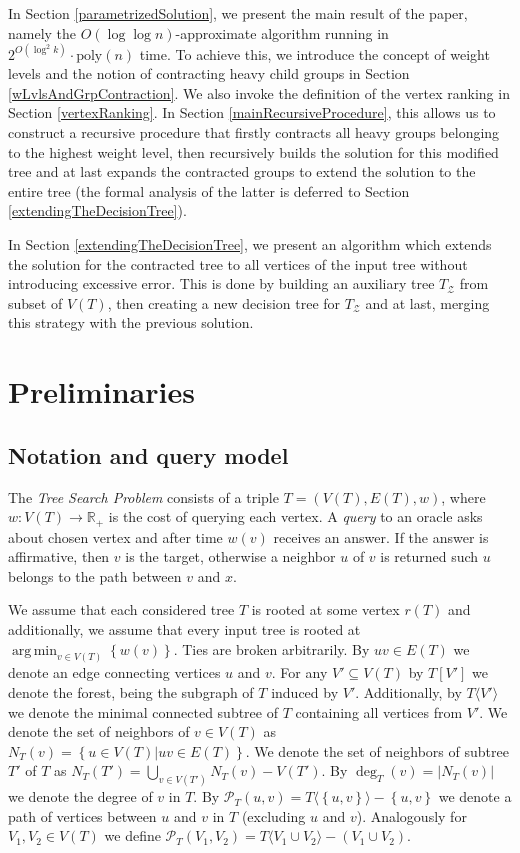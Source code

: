 \documentclass[a4paper, anonymous, numberwithinsect, pdfa, UKenglish,cleveref, autoref, thm-restate]{socg-lipics-v2021}
\newcommand{\br}[1]{\left( #1 \right)}
\newcommand{\brc}[1]{\left\{ #1 \right\}}
\newcommand{\spr}[1]{\left| #1 \right|}
\newcommand{\angl}[1]{\langle #1 \rangle}
\newcommand{\argmin}{\operatorname*{arg\,min}}
\begin{document}
In Section \ref{parametrizedSolution}, we present the main result of the paper, namely the $O\br{\log\log n}$-approximate algorithm running in $2^{O\br{\log^2k}}\cdot\text{poly}\br{n}$ time. To achieve this, we introduce the concept of weight levels and the notion of contracting heavy child groups in Section \ref{wLvlsAndGrpContraction}. We also invoke the definition of the vertex ranking in Section \ref{vertexRanking}. In Section \ref{mainRecursiveProcedure}, this allows us to construct a recursive procedure that firstly contracts all heavy groups belonging to the highest weight level, then recursively builds the solution for this modified tree and at last expands the contracted groups to extend the solution to the entire tree (the formal analysis of the latter is deferred to Section \ref{extendingTheDecisionTree}).

In Section \ref{extendingTheDecisionTree}, we present an algorithm which extends the solution for the contracted tree to all vertices of the input tree without introducing excessive error. This is done by building an auxiliary tree $T_{\mathcal{Z}}$ from subset of $V\br{T}$, then creating a new decision tree for $T_{\mathcal{Z}}$ and at last, merging this strategy with the previous solution.
\section{Preliminaries}\label{preliminaries}
\subsection{Notation and query model}\label{notationAndQueryModel}

The \textit{Tree Search Problem} consists of a triple $T=\br{V\br{T},E\br{T},w}$, where $w:V\br{T}\to \mathbb{R}_{+}$ is the cost of querying each vertex. A \textit{query} to an oracle asks about chosen vertex and after time $w(v)$ receives an answer. If the answer is affirmative, then $v$ is the target, otherwise a neighbor $u$ of $v$ is returned such $u$ belongs to the path between $v$ and $x$. 

We assume that each considered tree $T$ is rooted at some vertex $r\br{T}$ and additionally, we assume that every input tree is rooted at $\argmin_{v\in V\br{T}}\brc{w\br{v}}$. Ties are broken arbitrarily. By $uv\in E\br{T}
$ we denote an edge connecting vertices $u$ and $v$. For any $V'\subseteq V\br{T}$ by $T[V']$ we denote the forest, being the subgraph of $T$ induced by $V'$. Additionally, by $T\angl{V'}$ we denote the minimal connected subtree of $T$ containing all vertices from $V'$. We denote the set of neighbors of $v\in V\br{T}$ as $N_T\br{v} = \brc{u\in V\br{T}|uv\in E\br{T}}$. We denote the set of neighbors of subtree $T'$ of $T$ as $N_T\br{T'} = \bigcup_{v\in V\br{T'}}N_T\br{v}-V\br{T'}$. By $\deg_{T}\br{v}=\spr{N_T\br{v}}$ we denote the degree of $v$ in $T$. By $\mathcal{P}_{T}\br{u, v}=T\angl{\brc{u,v}}-\brc{u,v}$ we denote a path of vertices between $u$ and $v$ in $T$ (excluding $u$ and $v$). Analogously for $V_1,V_2\in V\br{T}$ we define $\mathcal{P}_{T}\br{V_1, V_2}=T\angl{V_1\cup V_2}-\br{V_1\cup V_2}$.
\end{document}
